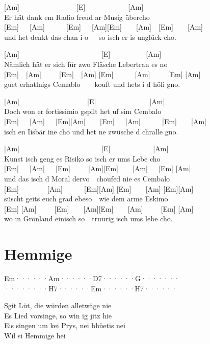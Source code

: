\documentclass[
  letterpaper,
]{scrbook}
\begin{document}
{[}Am{]}~~~~~~~~~~~~~~~~{[}E{]}~~~~~~~~~~~~{[}Am{]}\\
Er hät dank em Radio freud ar Musig übercho\\
{[}Em{]}~~~{[}Am{]}~~~~~~{[}Em{]}~~~{[}Am{]}{[}Em{]}~~~~{[}Am{]}~~{[}Em{]}~~~~{[}Am{]}\\
und het denkt das chan i o~~~so isch er is unglück cho.

{[}Am{]}~~~~~~~~~~~~~~~~~~~~~~~{[}E{]}~~~~~~~~~~{[}Am{]}\\
Nämlich hät er sich für zwo Fläsche Lebertran es no\\
{[}Em{]}~~{[}Am{]}~~~~~{[}Em{]}~~{[}Am{]}
{[}Em{]}~~~~~~{[}Am{]}~~~~~{[}Em{]} {[}Am{]}\\
guet erhatlnigs Cemablo~~~~kouft und hets i d höli gno.

{[}Am{]}~~~~~~~~~~~~~~~~~~~{[}E{]}~~~~~~~~~~~~~~~{[}Am{]}\\
Doch won er fortissimio gspilt het uf sim Cembalo\\
{[}Em{]}~~~{[}Am{]}~~~{[}Em{]}{[}Am{]}~~~~{[}Em{]}~~~{[}Am{]}~~~~~~{[}Em{]}~~~~{[}Am{]}\\
isch en Iisbär ine cho und het ne zwüsche d chralle gno.

{[}Am{]}~~~~~~~~~~~~~~~~~~~~~~~{[}E{]}~~~~~~~~~~~~{[}Am{]}\\
Kunst isch geng es Risiko so isch er ums Lebe cho\\
{[}Em{]}~~~{[}Am{]}~~~{[}Em{]}~~~~~{[}Am{]}{[}Em{]}~~~~{[}Am{]}~~~{[}Em{]}
{[}Am{]}\\
und das isch d Moral dervo~~choufed nie es Cembalo\\
{[}Em{]}~~~~~~~~{[}Am{]}~~~~~~{[}Em{]}{[}Am{]} {[}Em{]}~~~~{[}Am{]}
{[}Em{]}{[}Am{]}\\
süscht geits euch grad ebeso~~wie dem arme Eskimo\\
{[}Em{]}
{[}Am{]}~~~~~{[}Em{]}~~~~{[}Am{]}{[}Em{]}~~~~{[}Am{]}~~~~~{[}Em{]}
{[}Am{]}\\
wo in Grönland einisch so~~truurig isch ums lebe cho.

\hypertarget{hemmige}{%
\chapter{Hemmige}\label{hemmige}}

\textbar Em······\textbar Am······\textbar D7······\textbar G·······\textbar{}\\
\textbar········\textbar H7······\textbar Em······\textbar H7······\textbar{}

S\textquotesingle git Lüt, die würden alletwäge nie\\
Es Lied vorsinge, so win ig jitz hie\\
Eis singen um kei Prys, nei bhüetis nei\\
Wil si Hemmige hei
\end{document}
